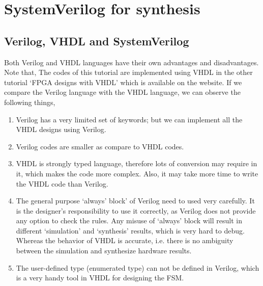 \chapter{SystemVerilog for synthesis} \label{ch:SystemVerilogSyn}

\graphicspath{{Chapters/SystemVerilogIntro/Figures/}}



\section{Verilog, VHDL and SystemVerilog}
Both Verilog and VHDL languages have their own advantages and disadvantages. Note that, The codes of this tutorial are implemented using VHDL in the other tutorial `FPGA designs with VHDL' which is available on the website. If we compare the Verilog language with the VHDL language, we can observe the following things, 

\begin{enumerate}
	\item Verilog has a very limited set of keywords; but we can implement all the VHDL designs using Verilog.   
	\item Verilog codes are smaller as compare to VHDL codes. 
	\item VHDL is strongly typed language, therefore lots of conversion may require in it, which makes the code more complex. Also, it may take more time to write the VHDL code than Verilog.
	\item The general purpose `always' block' of Verilog need to used very carefully. It is the designer's responsibility to use it correctly, as Verilog does not provide any option to check the rules. Any misuse of `always' block will result in different `simulation' and `synthesis' results, which is very hard to debug. Whereas the behavior of VHDL is accurate, i.e. there is no ambiguity between the simulation and synthesize hardware results. 
	\item The user-defined type (enumerated type) can not be defined in Verilog, which is a very handy tool in VHDL for designing the FSM. 
\end{enumerate}

